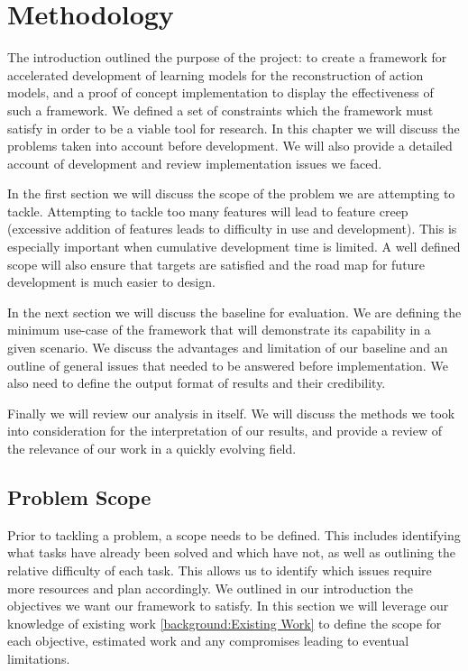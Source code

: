 \chapter{Methodology}
The introduction outlined the purpose of the project: to create a framework for accelerated development of learning models for the reconstruction of action models, and a proof of concept implementation to display the effectiveness of such a framework. We defined a set of constraints which the framework must satisfy in order to be a viable tool for research. In this chapter we will discuss the problems taken into account before development. We will also provide a detailed account of development and review implementation issues we faced.

In the first section we will discuss the scope of the problem we are attempting to tackle. Attempting to tackle too many features will lead to feature creep (excessive addition of features leads to difficulty in use and development). This is especially important when cumulative development time is limited. A well defined scope will also ensure that targets are satisfied and the road map for future development is much easier to design. 

In the next section we will discuss the baseline for evaluation. We are defining the minimum use-case of the framework that will demonstrate its capability in a given scenario. We discuss the advantages and limitation of our baseline and an outline of general issues that needed to be answered before implementation. We also need to define the output format of results and their credibility. 

Finally we will review our analysis in itself. We will discuss the methods we took into consideration for the interpretation of our results, and provide a review of the relevance of our work in a quickly evolving field.
\newpage

\section{Problem Scope}
Prior to tackling a problem, a scope needs to be defined. This includes identifying what tasks have already been solved and which have not, as well as outlining the relative difficulty of each task. This allows us to identify which issues require more resources and plan accordingly. We outlined in our introduction the objectives we want our framework to satisfy. In this section we will leverage our knowledge of existing work \ref{background:Existing Work} to define the scope for each objective, estimated work and any compromises leading to eventual limitations.
